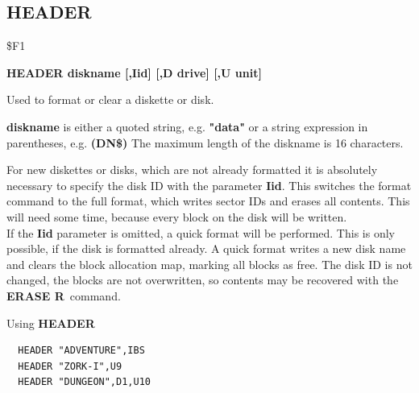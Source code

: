 \subsection{HEADER}
\begin{description}[leftmargin=2cm,style=nextline]
\item [Token:] \$F1
\item [Format:] {\bf HEADER diskname [,Iid] [,D drive] [,U unit] }
\item [Usage:]
   Used to format or clear a diskette
   or disk.

   {\bf diskname} is either a quoted string, e.g. {\bf "data"} or
   a string expression in parentheses, e.g. {\bf (DN\$)}
   The maximum length of the diskname is 16 characters.

   \drivedefinition

   \unitdefinition

\item [Remarks:]
   For new diskettes or disks, which are not already formatted
   it is absolutely necessary to specify the disk ID with the
   parameter {\bf Iid}. This switches the format command to the
   full format, which writes sector IDs and erases all contents.
   This will need some time, because every block on the disk will
   be written. \\
   If the {\bf Iid} parameter is omitted, a quick format will
   be performed. This is only possible, if the disk is formatted
   already. A quick format writes a new disk name and clears the
   block allocation map, marking all blocks as free.
   The disk ID is not changed, the blocks are not overwritten,
   so contents may be recovered with the {\bf ERASE R} command.

\item [Example:] Using {\bf HEADER}
\begin{tcolorbox}[colback=black,coltext=white]
\verbatimfont{\codefont}
\begin{verbatim}
  HEADER "ADVENTURE",IBS
  HEADER "ZORK-I",U9
  HEADER "DUNGEON",D1,U10
\end{verbatim}
\end{tcolorbox}
\end{description}


\newpage
